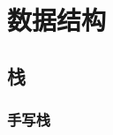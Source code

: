 \chapter{数据结构}\label{ch:data-structure}

\section{栈}\label{sec:stack}

\subsection{手写栈}\label{subsec:handwriting-stack}

